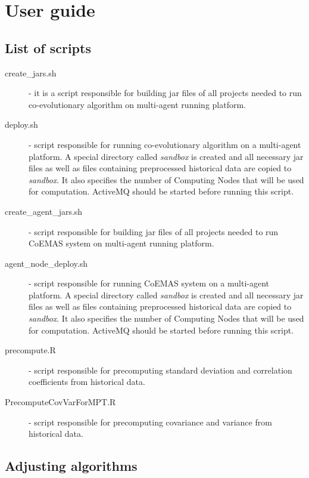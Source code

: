 \appendix
\chapter{User guide}
\label{cha:user_guide}


\section{List of scripts}

\begin{description}
  \item [create\_jars.sh]
      - it is a script responsible for building jar files of all projects needed to run co-evolutionary algorithm on multi-agent running platform. 
  \item [deploy.sh]
      - script responsible for running co-evolutionary algorithm on a multi-agent platform.
      A special directory called \emph{sandbox} is created and all necessary jar files as well as files containing preprocessed historical data are copied to \emph{sandbox}.
      It also specifies the number of Computing Nodes that will be used for computation.
      ActiveMQ should be started before running this script.
  \item [create\_agent\_jars.sh]
      - script responsible for building jar files of all projects needed to run CoEMAS system on multi-agent running platform. 
  \item [agent\_node\_deploy.sh]
      - script responsible for running CoEMAS system on a multi-agent platform.
      A special directory called \emph{sandbox} is created and all necessary jar files as well as files containing preprocessed historical data are copied to \emph{sandbox}.
      It also specifies the number of Computing Nodes that will be used for computation.
      ActiveMQ should be started before running this script. 
  \item [precompute.R]
      - script responsible for precomputing standard deviation and correlation coefficients from historical data.
  \item [PrecomputeCovVarForMPT.R]
      - script responsible for precomputing covariance and variance from historical data. 

\end{description}



\section{Adjusting algorithms}


